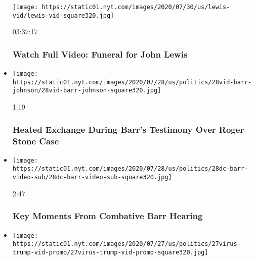 \begin{itemize}
  \texttt{[image: https://static01.nyt.com/images/2020/07/30/us/lewis-vid/lewis-vid-square320.jpg]}

  03:37:17

  \hypertarget{watch-full-video-funeral-for-john-lewis}{%
  \subsubsection{Watch Full Video: Funeral for John
  Lewis}\label{watch-full-video-funeral-for-john-lewis}}
\item
  \href{https://www.nytimes.com/video/us/politics/100000007261010/barr-johnson-roger-stone-trump.html?action=click\&module=video-series-bar\&region=header\&pgtype=Article\&playlistId=video/us-politics}{}

  \texttt{[image: https://static01.nyt.com/images/2020/07/28/us/politics/28vid-barr-johnson/28vid-barr-johnson-square320.jpg]}

  1:19

  \hypertarget{heated-exchange-during-barrs-testimony-over-roger-stone-case}{%
  \subsubsection{Heated Exchange During Barr's Testimony Over Roger
  Stone
  Case}\label{heated-exchange-during-barrs-testimony-over-roger-stone-case}}
\item
  \href{https://www.nytimes.com/video/us/politics/100000007260259/barr-testifies-house-judiciary.html?action=click\&module=video-series-bar\&region=header\&pgtype=Article\&playlistId=video/us-politics}{}

  \texttt{[image: https://static01.nyt.com/images/2020/07/28/us/politics/28dc-barr-video-sub/28dc-barr-video-sub-square320.jpg]}

  2:47

  \hypertarget{key-moments-from-combative-barr-hearing}{%
  \subsubsection{Key Moments From Combative Barr
  Hearing}\label{key-moments-from-combative-barr-hearing}}
\item
  \href{https://www.nytimes.com/video/us/100000007258794/trump-boasts-vaccine-progress-north-carolina.html?action=click\&module=video-series-bar\&region=header\&pgtype=Article\&playlistId=video/us-politics}{}

  \texttt{[image: https://static01.nyt.com/images/2020/07/27/us/politics/27virus-trump-vid-promo/27virus-trump-vid-promo-square320.jpg]}


\end{itemize}

